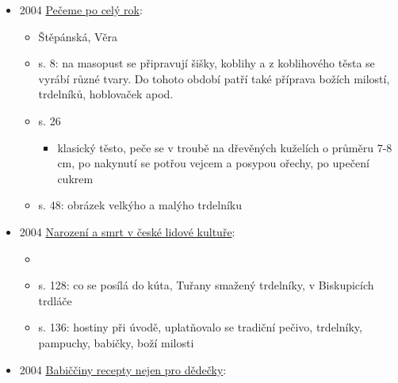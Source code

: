 \begin{itemize}
  \begin{itemize}
  \tightlist
  \item
  \item
    vzpomíná, jak se v 50. letech poprvé setkala s trdelníky, lidovým
    pečivem, či přesněji řečeno v této fázi vývoje smaživem
  \item
    dělala učitelku v jedné vsi u Brna
  \item
    pomáhala při draní peří skupině místních žen, pak jí pohostily
    smaženým trdelníkem
  \end{itemize}
\item
  2004
  \href{https://ceskadigitalniknihovna.cz/uuid/uuid:a088d120-1f29-11e6-8803-005056827e51}{Pečeme
  po celý rok}:

  \begin{itemize}
  \tightlist
  \item
    Štěpánská, Věra
  \item
    s. 8: na masopust se připravují šišky, koblihy a z koblihového těsta
    se vyrábí různé tvary. Do tohoto období patří také příprava božích
    milostí, trdelníků, hoblovaček apod.
  \item
    s. 26 

    \begin{itemize}
    \tightlist
    \item
      klasický těsto, peče se v troubě na dřevěných kuželích o průměru
      7-8 cm, po nakynutí se potřou vejcem a posypou ořechy, po upečení
      cukrem
    \end{itemize}
  \item
    s. 48: obrázek velkýho a malýho trdelníku
  \end{itemize}
\item
  2004
  \href{https://ceskadigitalniknihovna.cz/uuid/uuid:6544a590-d474-11e4-8565-005056827e52}{Narození
  a smrt v české lidové kultuře}:

  \begin{itemize}
  \tightlist
  \item
  \item
    s. 128: co se posílá do kúta, Tuřany smažený trdelníky, v
    Biskupicích trdláče
  \item
    s. 136: hostiny při úvodě, uplatňovalo se tradiční pečivo,
    trdelníky, pampuchy, babičky, boží milosti
  \end{itemize}
\item
  2004
  \href{https://www.digitalniknihovna.cz/mzk/uuid/uuid:5823cdf0-1024-11ea-af21-005056827e52}{Babiččiny
  recepty nejen pro dědečky}:


\end{itemize}
